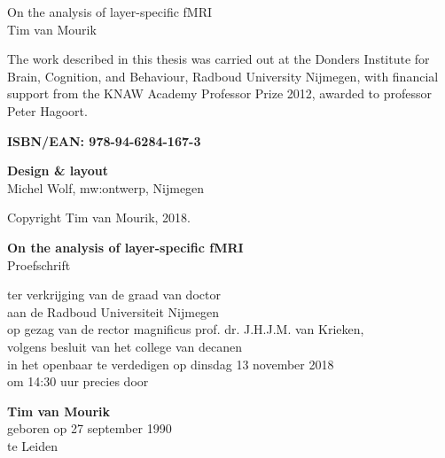 \thispagestyle{empty}

{\setlength{\parindent}{0cm}
	\begin{flushright}
		\vspace{120pt}
		\huge{On the analysis of layer-specific fMRI}\\
		\vspace{80pt}
		\large{Tim van Mourik}
	\end{flushright}
}

\newpage

\thispagestyle{empty}
{\setlength{\parindent}{0cm}\raggedright%
\null\vfill

The work described in this thesis was carried out at the Donders Institute for Brain, Cognition, and Behaviour, Radboud University Nijmegen, with financial support from the KNAW Academy Professor Prize 2012, awarded to professor Peter Hagoort.

\vspace{12pt}

\textbf{ISBN/EAN: 978-94-6284-167-3}

\vspace{12pt}
\textbf{Design \& layout}\\
Michel Wolf, mw:ontwerp, Nijmegen

\vspace{12pt}
Copyright {\textcopyright} Tim van Mourik, 2018. 
}

\newpage

\thispagestyle{empty}
\begin{minipage}[c]{100mm}

\begin{center}
\vspace{20pt}
\large{\textbf{On the analysis of layer-specific fMRI}}\\
\vspace{70pt}
\large{Proefschrift}\\
\vspace{60pt}

{
ter verkrijging van de graad van doctor \\ 
aan de Radboud Universiteit Nijmegen\\
op gezag van de rector magnificus prof. dr. J.H.J.M. van Krieken, \\
volgens besluit van het college van decanen\\ 
in het openbaar te verdedigen op dinsdag 13 november 2018\\ 
om 14:30 uur precies
}
\vspace{30pt}
door
\vspace{30pt}

{\textbf{Tim van Mourik}}\\
geboren op 27 september 1990\\
te Leiden
\end{center}

\end{minipage}
%
\newpage
\thispagestyle{empty}

